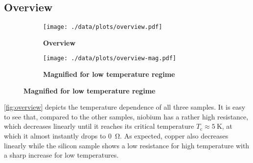 \subsection{Overview}
\begin{figure}
	\centering
	\begin{subfigure}{\textwidth}
		\centering
		\texttt{[image: ./data/plots/overview.pdf]}
		\caption{\textbf{Overview}}
	\end{subfigure}
	\hspace*{\fill}
	\begin{subfigure}{\textwidth}
		\centering
		\texttt{[image: ./data/plots/overview-mag.pdf]}
		\caption{\textbf{Magnified for low temperature regime}}
	\end{subfigure}
	\label{fig:overview}
\end{figure}

\autoref{fig:overview} depicts the temperature dependence of all three samples.
It is easy to see that, compared to the other samples, niobium has a rather high resistance, which decreases linearly until it reaches its critical temperature $T_\text{c}\approx\SI{5}{\kelvin}$, at which it almost instantly drops to \SI{0}{\ohm}.
As expected, copper also decreases linearly while the silicon sample shows a low resistance for high temperature with a sharp increase for low temperatures.

